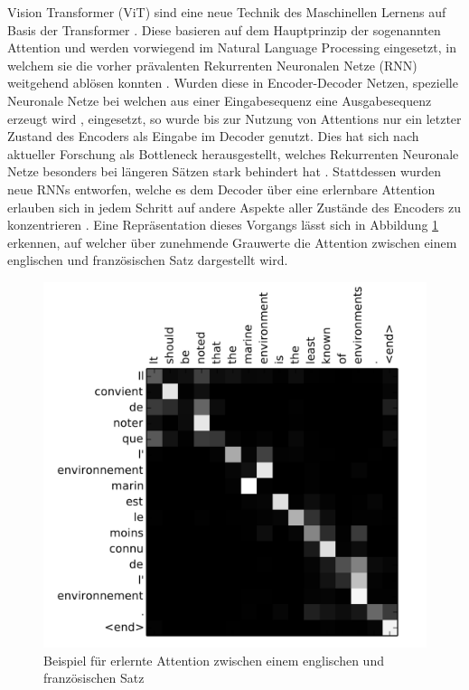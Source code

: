 \documentclass[twoside,a4paper]{IEEEtran}
\begin{document}
Vision Transformer (ViT) sind eine neue Technik des Maschinellen Lernens auf Basis der Transformer \cite{TRANSFORMERS}. Diese basieren auf dem Hauptprinzip der sogenannten Attention und werden vorwiegend im Natural Language Processing eingesetzt, in welchem sie die vorher prävalenten Rekurrenten Neuronalen Netze (RNN) weitgehend ablösen konnten \cite{TRANSFORMERS}. Wurden diese in Encoder-Decoder Netzen, spezielle Neuronale Netze bei welchen aus einer Eingabesequenz eine Ausgabesequenz erzeugt wird \cite[S.388-389]{MACHINE_LEARNING}, eingesetzt, so wurde bis zur Nutzung von Attentions nur ein letzter Zustand des Encoders als Eingabe im Decoder genutzt. Dies hat sich nach aktueller Forschung als Bottleneck herausgestellt, welches Rekurrenten Neuronale Netze besonders bei längeren Sätzen stark behindert hat \cite[S.2]{TRANSFORMERS}. Stattdessen wurden neue RNNs entworfen, welche es dem Decoder über eine erlernbare Attention erlauben sich in jedem Schritt auf andere Aspekte aller Zustände des Encoders zu konzentrieren \cite[S.4]{RNN_ATTENTION}. Eine Repräsentation dieses Vorgangs lässt sich in Abbildung \ref{bildAttention} erkennen, auf welcher über zunehmende Grauwerte die Attention zwischen einem englischen und französischen Satz dargestellt wird.

\begin{figure}[!htb]
	\includegraphics[width=\columnwidth]{attention_visualized}
	\caption{Beispiel für erlernte Attention zwischen einem englischen und französischen Satz \cite[S.6]{RNN_ATTENTION}}
	\label{bildAttention}
\end{figure}
\end{document}
